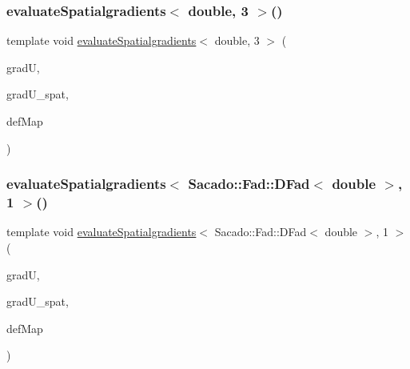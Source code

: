 \mbox{\label{function_evaluations_8cc_a9c17d7db3f0ade6c01cfb5450b958efc}} 
\subsubsection{\texorpdfstring{evaluate\+Spatialgradients$<$ double, 3 $>$()}{evaluateSpatialgradients< double, 3 >()}\hspace{0.1cm}{\footnotesize\ttfamily [2/2]}}
{\footnotesize\ttfamily template void \mbox{\hyperlink{group___evaluation_functions_ga0b976342d491f6215953e2e65ea6a0de}{evaluate\+Spatialgradients}}$<$ double, 3 $>$ (\begin{DoxyParamCaption}\item[{Table$<$ 3, double $>$ \&}]{gradU,  }\item[{Table$<$ 3, double $>$}]{grad\+U\+\_\+spat,  }\item[{\mbox{\hyperlink{structdeformation_map}{deformation\+Map}}$<$ double, 3 $>$ \&}]{def\+Map }\end{DoxyParamCaption})}

\mbox{\label{function_evaluations_8cc_a63fd1422475c69c324aefec06a9b4fa0}} 
\subsubsection{\texorpdfstring{evaluate\+Spatialgradients$<$ Sacado\+::\+Fad\+::\+D\+Fad$<$ double $>$, 1 $>$()}{evaluateSpatialgradients< Sacado::Fad::DFad< double >, 1 >()}\hspace{0.1cm}{\footnotesize\ttfamily [1/2]}}
{\footnotesize\ttfamily template void \mbox{\hyperlink{group___evaluation_functions_ga0b976342d491f6215953e2e65ea6a0de}{evaluate\+Spatialgradients}}$<$ Sacado\+::\+Fad\+::\+D\+Fad$<$ double $>$, 1 $>$ (\begin{DoxyParamCaption}\item[{Table$<$ 2, Sacado\+::\+Fad\+::\+D\+Fad$<$ double $>$$>$ \&}]{gradU,  }\item[{Table$<$ 2, Sacado\+::\+Fad\+::\+D\+Fad$<$ double $>$$>$}]{grad\+U\+\_\+spat,  }\item[{\mbox{\hyperlink{structdeformation_map}{deformation\+Map}}$<$ Sacado\+::\+Fad\+::\+D\+Fad$<$ double $>$, 1 $>$ \&}]{def\+Map }\end{DoxyParamCaption})}

